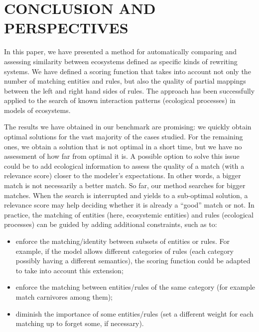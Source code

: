 \documentclass[a4paper,twoside]{article}
\begin{document}
\section{\uppercase{Conclusion and perspectives}}
\label{sec:conclusion}

In this paper, we have presented a method for automatically comparing and assessing similarity between ecosystems defined as specific kinds of rewriting systems. 
We have defined a scoring function that takes into account not only the number of matching entities and rules, but also the quality of partial mappings between the left and right hand sides of rules. 
The approach has been successfully applied to the search of known interaction patterns (\ie ecological processes) in models of ecosystems. 

The results we have obtained in our benchmark are promising: we quickly obtain optimal solutions for the vast majority of the cases studied. 
For the remaining ones, we obtain a solution that is not optimal in a short time, but we have no assessment of how far from optimal it is.
A possible option to solve this issue could be to add ecological information to assess the quality of a match (with a relevance score) closer to the modeler's expectations.  
In other words, a bigger match is not necessarily a better match. So far, our method searches for bigger matches. When the search is interrupted and yields to a sub-optimal solution, a relevance score may help deciding whether it is already a ``good'' match or not.   
In practice, the matching of entities (here, ecosystemic entities) and rules (ecological processes) can be guided by adding additional constraints, such as to:  
\begin{itemize}
 \item enforce the matching/identity between subsets of entities or rules. For example, if the model allows different categories of rules (each category possibly having a different semantics), the scoring function could be adapted to take into account this extension;  
 \item enforce the matching between entities/rules of the same category (for example match carnivores among them);
 \item diminish the importance of some entities/rules (\ie set a different weight for each matching up to forget some, if necessary).
 \end{itemize}
\end{document}
